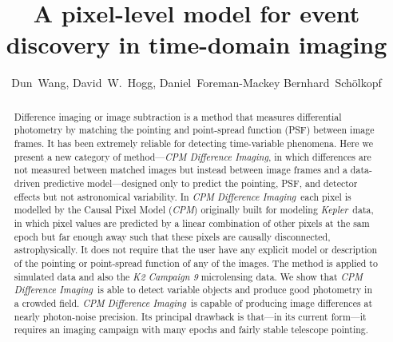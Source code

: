 \documentclass[12pt, preprint]{aastex}
\newcommand{\project}[1]{\textsl{#1}}
\newcommand{\cpm}{\project{CPM}}
\newcommand{\cpmdiff}{\project{CPM Difference Imaging}}
\newcommand{\kepler}{\project{Kepler}}
\begin{document}
\title{A pixel-level model for event discovery in time-domain imaging}
\author{%
  Dun~Wang\altaffilmark{\ref{CCPP},\ref{email}},
  David~W.~Hogg\altaffilmark{\ref{CCPP},\ref{CDS},\ref{MPIA},\ref{FI}},
  Daniel~Foreman-Mackey\altaffilmark{\ref{UW},\ref{SF}}
  Bernhard~Sch\"olkopf\altaffilmark{\ref{MPIIS}}
  }
\setcounter{address}{1}


\begin{abstract}
Difference imaging or image subtraction is a method that measures differential photometry by matching the pointing and point-spread function (PSF) between image frames. 
It has been extremely reliable for detecting time-variable phenomena.
Here we present a new category of method---\cpmdiff, in which differences are not measured between matched images but instead between image frames and a data-driven predictive model---designed only to predict the pointing, PSF, and detector effects but not astronomical variability. 
In \cpmdiff\ each pixel is modelled by the Causal Pixel Model (\cpm) originally built for modeling \kepler\ data, in which pixel values are predicted by a linear combination of other pixels at the sam epoch but far enough away such that these pixels are causally disconnected, astrophysically. 
It does not require that the user have any explicit model or description of the pointing or point-spread function of any of the images.
The method is applied to simulated data and also the \project{K2 Campaign 9} microlensing data. 
We show that \cpmdiff\ is able to detect variable objects and produce good photometry in a crowded field.
\cpmdiff\ is capable of producing image differences at nearly photon-noise precision. 
Its principal drawback is that---in its current form---it requires an imaging campaign with many epochs and fairly stable telescope pointing.
\end{abstract}
\end{document}
